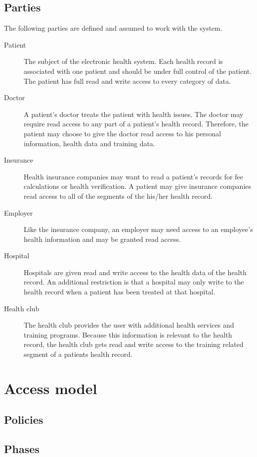 \documentclass[a4paper]{article}
\begin{document}
	\subsection{Parties}
		The following parties are defined and assumed to work with the system.
		
		\begin{description}
			\item[Patient] The subject of the electronic health system. Each health record is associated with one patient and should be under full control of the patient. The patient has full read and write access to every category of data.
			\item[Doctor] A patient's doctor treats the patient with health issues. The doctor may require read access to any part of a patient's health record. Therefore, the patient may choose to give the doctor read access to his personal information, health data and training data.
			\item[Insurance] Health insurance companies may want to read a patient's records for fee calculations or health verification. A patient may give insurance companies read access to all of the segments of the his/her health record.
			\item[Employer] Like the insurance company, an employer may need access to an employee's health information and may be granted read access.  
			\item[Hospital] Hospitals are given read and write access to the health data of the health record. An additional restriction is that a hospital may only write to the health record when a patient has been treated at that hospital.
			\item[Health club] The health club provides the user with additional health services and training programs. Because this information is relevant to the health record, the health club gets read and write access to the training related segment of a patients health record.
		\end{description}

\section{Access model}
	\subsection{Policies}
	
	\subsection{Phases}
\end{document}
